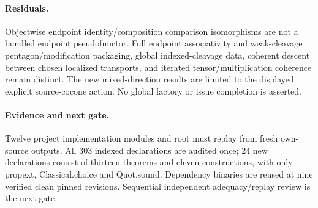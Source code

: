 \documentclass{article}
\begin{document}
\paragraph{Residuals.} Objectwise endpoint identity/composition comparison isomorphisms are not a bundled endpoint pseudofunctor. Full endpoint associativity and weak-cleavage pentagon/modification packaging, global indexed-cleavage data, coherent descent between chosen localized transports, and iterated tensor/multiplication coherence remain distinct. The new mixed-direction results are limited to the displayed explicit source-cocone action. No global factory or issue completion is asserted.
\paragraph{Evidence and next gate.} Twelve project implementation modules and root must replay from fresh own-source outputs. All 303 indexed declarations are audited once; 24 new declarations consist of thirteen theorems and eleven constructions, with only propext, Classical.choice and Quot.sound. Dependency binaries are reused at nine verified clean pinned revisions. Sequential independent adequacy/replay review is the next gate.
\end{document}
